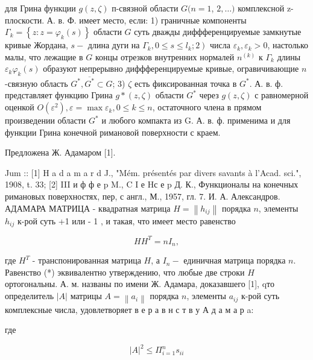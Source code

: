 \documentclass[10pt]{article}
\begin{document}
для Грина функции $g(z, \zeta)$ п-связной области $G(n=1$, $2, \ldots)$ комплексной z-плоскости. А. в. Ф. имеет место, если: 1) граничные компоненты $\Gamma_{k}=\left\{z: z=\varphi_{k}(s)\right\}$ области $G$ суть дважды диффференцируемые замкнутые кривые Жордана, $s-$ длина дуги на $\left.\Gamma_{k}, 0 \leqslant s \leqslant l_{k} ; 2\right)$ числа $\varepsilon_{k}, \varepsilon_{k}>0$, настолько малы, что лежащие в $G$ концы отрезков внутренних нормалей $n^{(k)}$ к $\Gamma_{k}$ длины $\varepsilon_{k} \varphi_{k}(s)$ образуют непрерывно диффференцируемые кривые, огравичивающие $n$-связную область $G^{*}, \overline{G^{*}} \subset G$; 3) $\zeta$ есть фиксированная точка в $G^{*}$. А. в. ф. представляет функцию Грина $g *(z, \zeta)$ области $G^{*}$ через $g(z, \zeta)$ с равномерной оценкой $O\left(\varepsilon^{2}\right), \varepsilon=\max \varepsilon_{k}, 0 \leqslant k \leqslant n$, остаточного члена в прямом произведении области $G^{*}$ и любого компакта из G. А. в. ф. применима и для функции Грина конечной римановой поверхности с краем.



Предложена Ж. Адамаром [1].



Jum :: [1] H a d a m a r d J., "Mém. présentés par divers savants à l'Acad. sci.", 1908, t. 33; [2] III и ф ф е p M., C I е Hс е p Д. К., Функционалы на конечных римановых поверхностях, пер, с англ., М., 1957, гл. 7. И. А. Александров. АДАМАРА МАТРИЦА - квадратная матрица $H=\left\|h_{i j}\right\|$ порядка $n$, элементы $h_{i j}$ к-рой суть +1 или - 1 , и такая, что имеет место равенство



\[

H H^{T}=n I_{n},

\]



где $H^{T}$ - транспонированная матрица $H$, а $I_{n}-$ единичная матрица порядка $n$. Равенство (*) эквивалентно утверждению, что любые две строки $H$ ортогональны. А. м. названы по имени Ж. Адамара, доказавшего [1], qто определитель $|A|$ матрицы $A=\left\|a_{i}\right\|$ порядка $n$, элементы $a_{i j}$ к-рой суть комплексные числа, удовлетворяет в е р а в н с т в у А д а м а р a:



где



\[

|A|^{2} \leqslant \Pi_{i=1}^{n} s_{i i}

\]
\end{document}
